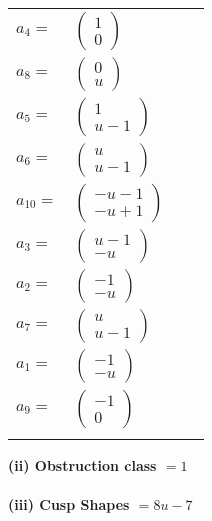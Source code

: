 \documentclass[1p]{elsarticle_modified}
\theoremstyle{definition}
\begin{document}
\begin{tabular}{m{7pt} m{180pt} m{7pt} m{180pt} }
\flushright $a_{4}=$&$\begin{pmatrix}1\\0\end{pmatrix}$ \\
\flushright $a_{8}=$&$\begin{pmatrix}0\\u\end{pmatrix}$ \\
\flushright $a_{5}=$&$\begin{pmatrix}1\\u-1\end{pmatrix}$ \\
\flushright $a_{6}=$&$\begin{pmatrix}u\\u-1\end{pmatrix}$ \\
\flushright $a_{10}=$&$\begin{pmatrix}- u-1\\- u+1\end{pmatrix}$ \\
\flushright $a_{3}=$&$\begin{pmatrix}u-1\\- u\end{pmatrix}$ \\
\flushright $a_{2}=$&$\begin{pmatrix}-1\\- u\end{pmatrix}$ \\
\flushright $a_{7}=$&$\begin{pmatrix}u\\u-1\end{pmatrix}$ \\
\flushright $a_{1}=$&$\begin{pmatrix}-1\\- u\end{pmatrix}$ \\
\flushright $a_{9}=$&$\begin{pmatrix}-1\\0\end{pmatrix}$\\&\end{tabular}
\flushleft \textbf{(ii) Obstruction class $= 1$}\\~\\
\flushleft \textbf{(iii) Cusp Shapes $= 8 u-7$}\\~\\
\end{document}
